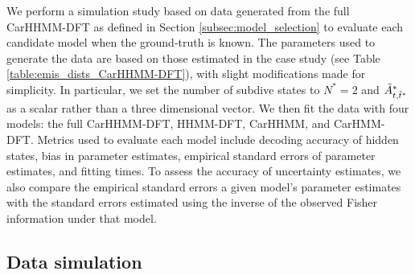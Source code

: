 
We perform a simulation study based on data generated from the full CarHHMM-DFT as defined in Section \ref{subsec:model_selection} to evaluate each candidate model when the ground-truth is known. The parameters used to generate the data are based on those estimated in the case study (see Table \ref{table:emis_dists_CarHHMM-DFT}), with slight modifications made for simplicity. In particular, we set the number of subdive states to $N^*=2$ and $\tilde{A}^*_{t,\tilde t^*}$ as a scalar rather than a three dimensional vector. We then fit the data with four models: the full CarHHMM-DFT, HHMM-DFT, CarHHMM, and CarHMM-DFT. Metrics used to evaluate each model include decoding accuracy of hidden states, bias in parameter estimates, empirical standard errors of parameter estimates, and fitting times. To assess the accuracy of uncertainty estimates, we also compare the empirical standard errors a given model's parameter estimates with the standard errors estimated using the inverse of the observed Fisher information under that model.

\subsection{Data simulation}
\label{subsec:data_simulation}

